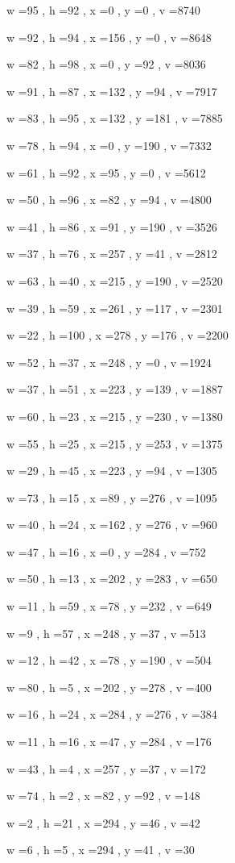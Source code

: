 \documentclass[11pt]{article}
\begin{document}
w =95 , h =92 , x =0 , y =0 , v =8740
\par
w =92 , h =94 , x =156 , y =0 , v =8648
\par
w =82 , h =98 , x =0 , y =92 , v =8036
\par
w =91 , h =87 , x =132 , y =94 , v =7917
\par
w =83 , h =95 , x =132 , y =181 , v =7885
\par
w =78 , h =94 , x =0 , y =190 , v =7332
\par
w =61 , h =92 , x =95 , y =0 , v =5612
\par
w =50 , h =96 , x =82 , y =94 , v =4800
\par
w =41 , h =86 , x =91 , y =190 , v =3526
\par
w =37 , h =76 , x =257 , y =41 , v =2812
\par
w =63 , h =40 , x =215 , y =190 , v =2520
\par
w =39 , h =59 , x =261 , y =117 , v =2301
\par
w =22 , h =100 , x =278 , y =176 , v =2200
\par
w =52 , h =37 , x =248 , y =0 , v =1924
\par
w =37 , h =51 , x =223 , y =139 , v =1887
\par
w =60 , h =23 , x =215 , y =230 , v =1380
\par
w =55 , h =25 , x =215 , y =253 , v =1375
\par
w =29 , h =45 , x =223 , y =94 , v =1305
\par
w =73 , h =15 , x =89 , y =276 , v =1095
\par
w =40 , h =24 , x =162 , y =276 , v =960
\par
w =47 , h =16 , x =0 , y =284 , v =752
\par
w =50 , h =13 , x =202 , y =283 , v =650
\par
w =11 , h =59 , x =78 , y =232 , v =649
\par
w =9 , h =57 , x =248 , y =37 , v =513
\par
w =12 , h =42 , x =78 , y =190 , v =504
\par
w =80 , h =5 , x =202 , y =278 , v =400
\par
w =16 , h =24 , x =284 , y =276 , v =384
\par
w =11 , h =16 , x =47 , y =284 , v =176
\par
w =43 , h =4 , x =257 , y =37 , v =172
\par
w =74 , h =2 , x =82 , y =92 , v =148
\par
w =2 , h =21 , x =294 , y =46 , v =42
\par
w =6 , h =5 , x =294 , y =41 , v =30
\par
\newpage
\end{document}
